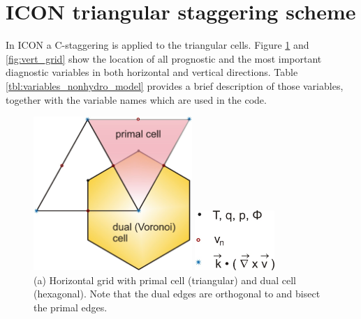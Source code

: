 \documentclass[a4paper,11pt,DIV16,BCOR1cm,titlepage]{scrartcl}
\begin{document}
\section{ICON triangular staggering scheme}
\label{sec:triangular_model_structures}

In ICON a C-staggering is applied to the triangular cells. Figure \ref{fig:hor_grid} and 
\ref{fig:vert_grid} show the location of all prognostic and the most important diagnostic 
variables in both horizontal and vertical directions. Table \ref{tbl:variables_nonhydro_model} 
provides a brief description of those variables, together with the variable names which are used 
in the code.
\begin{figure}[tbh]
  \begin{minipage}[t]{\linewidth}
    \begin{minipage}[t]{0.77\linewidth}
      \centering
      \includegraphics[width=6cm,draft=false]{../contrib/ICON_Grafik1_Okt09.jpg} %
    \end{minipage}
    \begin{minipage}[t]{0.2\linewidth}
      \includegraphics[width=3.0cm,draft=false]{../contrib/ICON_Grafik1_Legende_Okt09.jpg} %
    \end{minipage}
    \caption{(a) Horizontal grid with primal cell (triangular) and dual cell (hexagonal). 
    Note that the dual edges are orthogonal to and bisect the primal edges.}\label{fig:hor_grid}
  \end{minipage}
  \begin{minipage}[t]{\linewidth}
\vspace{0.4cm}

\end{minipage}
\end{figure}
\end{document}
